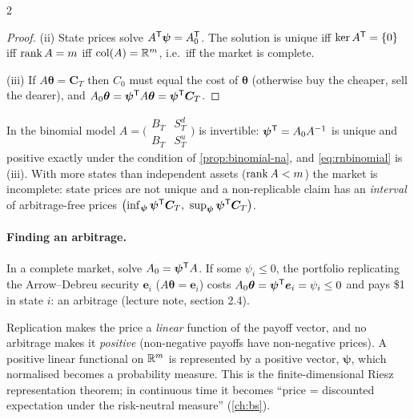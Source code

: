 \begin{paracol}{2}
\begin{proof}
(ii) State prices solve $A^{\mathsf T}\bm\psi=A_0^{\mathsf T}$. The solution is unique iff $\ker A^{\mathsf T}=\{0\}$ iff
$\operatorname{rank} A=m$ iff $\operatorname{col}(A)=\mathbb{R}^m$, i.e.\ iff the market is complete.

(iii) If $A\bm\theta=\bm C_T$ then $C_0$ must equal the cost of $\bm\theta$ (otherwise buy the cheaper, sell the
dearer), and $A_0\bm\theta=\bm\psi^{\mathsf T} A\bm\theta=\bm\psi^{\mathsf T}\bm C_T$.
\end{proof}

\begin{remark}
In the binomial model $A=\bigl(\begin{smallmatrix}B_T & S_T^d\\ B_T & S_T^u\end{smallmatrix}\bigr)$ is invertible:
$\bm\psi^{\mathsf T}=A_0A^{-1}$ is unique and positive exactly under the condition of \cref{prop:binomial-na},
and \eqref{eq:rnbinomial} is (iii). With more states than independent assets ($\operatorname{rank} A<m$) the market
is incomplete: state prices are not unique and a non-replicable claim has an \emph{interval} of
arbitrage-free prices $\bigl(\inf_{\bm\psi}\bm\psi\T\bm C_T,\ \sup_{\bm\psi}\bm\psi\T\bm C_T\bigr)$.
\end{remark}

\paragraph{Finding an arbitrage.} In a complete market, solve $A_0=\bm\psi^{\mathsf T} A$. If some
$\psi_i\le0$, the portfolio replicating the Arrow--Debreu security $\bm e_i$ ($A\bm\theta=\bm e_i$) costs
$A_0\bm\theta=\bm\psi^{\mathsf T}\bm e_i=\psi_i\le0$ and pays \$1 in state $i$: an arbitrage (lecture note,
section 2.4).

\begin{intuition}
Replication makes the price a \emph{linear} function of the payoff vector, and no arbitrage makes it
\emph{positive} (non-negative payoffs have non-negative prices). A positive linear functional on $\mathbb{R}^m$
is represented by a positive vector, $\bm\psi$, which normalised becomes a probability measure. This is
the finite-dimensional Riesz representation theorem; in continuous time it becomes ``price =
discounted expectation under the risk-neutral measure'' (\cref{ch:bs}).
\end{intuition}


\end{paracol}
